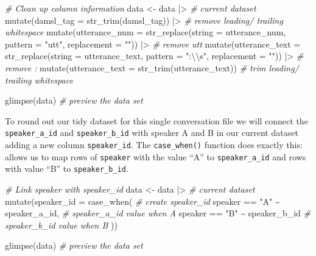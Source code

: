 \documentclass[
  letterpaper,
  DIV=11,
  numbers=noendperiod]{scrreport}
\newenvironment{Shaded}{\begin{snugshade}}{\end{snugshade}}
\newcommand{\AttributeTok}[1]{\textcolor[rgb]{0.00,0.00,0.00}{#1}}
\newcommand{\CommentTok}[1]{\textcolor[rgb]{0.00,0.00,0.00}{\textit{#1}}}
\newcommand{\FunctionTok}[1]{\textcolor[rgb]{0.00,0.00,0.00}{#1}}
\newcommand{\NormalTok}[1]{\textcolor[rgb]{0.00,0.00,0.00}{#1}}
\newcommand{\OtherTok}[1]{\textcolor[rgb]{0.00,0.00,0.00}{#1}}
\newcommand{\SpecialCharTok}[1]{\textcolor[rgb]{0.00,0.00,0.00}{#1}}
\newcommand{\StringTok}[1]{\textcolor[rgb]{0.00,0.00,0.00}{#1}}
\theoremstyle{definition}
\theoremstyle{remark}
\begin{document}
\begin{Shaded}
\begin{Highlighting}[]
\CommentTok{\# Clean up column information}
\NormalTok{data }\OtherTok{\textless{}{-}}
\NormalTok{  data }\SpecialCharTok{|\textgreater{}} \CommentTok{\# current dataset}
  \FunctionTok{mutate}\NormalTok{(}\AttributeTok{damsl\_tag =} \FunctionTok{str\_trim}\NormalTok{(damsl\_tag)) }\SpecialCharTok{|\textgreater{}} \CommentTok{\# remove leading/ trailing whitespace}
  \FunctionTok{mutate}\NormalTok{(}\AttributeTok{utterance\_num =} \FunctionTok{str\_replace}\NormalTok{(}\AttributeTok{string =}\NormalTok{ utterance\_num, }\AttributeTok{pattern =} \StringTok{"utt"}\NormalTok{, }\AttributeTok{replacement =} \StringTok{""}\NormalTok{)) }\SpecialCharTok{|\textgreater{}} \CommentTok{\# remove \textquotesingle{}utt\textquotesingle{}}
  \FunctionTok{mutate}\NormalTok{(}\AttributeTok{utterance\_text =} \FunctionTok{str\_replace}\NormalTok{(}\AttributeTok{string =}\NormalTok{ utterance\_text, }\AttributeTok{pattern =} \StringTok{":}\SpecialCharTok{\textbackslash{}\textbackslash{}}\StringTok{s"}\NormalTok{, }\AttributeTok{replacement =} \StringTok{""}\NormalTok{)) }\SpecialCharTok{|\textgreater{}} \CommentTok{\# remove \textquotesingle{}: \textquotesingle{}}
  \FunctionTok{mutate}\NormalTok{(}\AttributeTok{utterance\_text =} \FunctionTok{str\_trim}\NormalTok{(utterance\_text)) }\CommentTok{\# trim leading/ trailing whitespace}

\FunctionTok{glimpse}\NormalTok{(data) }\CommentTok{\# preview the data set}
\end{Highlighting}
\end{Shaded}

To round out our tidy dataset for this single conversation file we will
connect the \texttt{speaker\_a\_id} and \texttt{speaker\_b\_id} with
speaker A and B in our current dataset adding a new column
\texttt{speaker\_id}. The \texttt{case\_when()} function does exactly
this: allows us to map rows of \texttt{speaker} with the value ``A'' to
\texttt{speaker\_a\_id} and rows with value ``B'' to
\texttt{speaker\_b\_id}.

\begin{Shaded}
\begin{Highlighting}[]
\CommentTok{\# Link speaker with speaker\_id}
\NormalTok{data }\OtherTok{\textless{}{-}}
\NormalTok{  data }\SpecialCharTok{|\textgreater{}} \CommentTok{\# current dataset}
  \FunctionTok{mutate}\NormalTok{(}\AttributeTok{speaker\_id =} \FunctionTok{case\_when}\NormalTok{( }\CommentTok{\# create speaker\_id}
\NormalTok{    speaker }\SpecialCharTok{==} \StringTok{"A"} \SpecialCharTok{\textasciitilde{}}\NormalTok{ speaker\_a\_id, }\CommentTok{\# speaker\_a\_id value when A}
\NormalTok{    speaker }\SpecialCharTok{==} \StringTok{"B"} \SpecialCharTok{\textasciitilde{}}\NormalTok{ speaker\_b\_id }\CommentTok{\# speaker\_b\_id value when B}
\NormalTok{  ))}

\FunctionTok{glimpse}\NormalTok{(data) }\CommentTok{\# preview the data set}
\end{Highlighting}
\end{Shaded}
\end{document}
